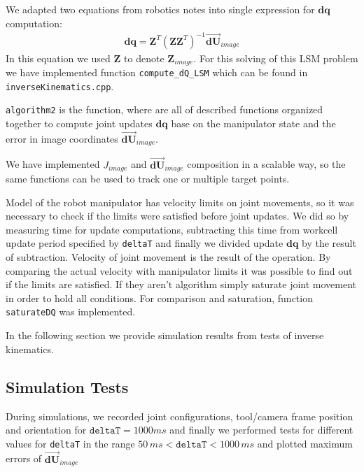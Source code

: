 \documentclass[]{scrartcl}
\begin{document}
We adapted two equations from robotics notes into single expression for ${\boldsymbol{dq}}$ computation:
\begin{align}
	\boldsymbol{dq} = \boldsymbol{Z}^T\left(\boldsymbol{Z}\boldsymbol{Z}^T\right)^{-1} \overrightarrow{\boldsymbol{dU}}_{image}
\end{align}
In this equation we used $\boldsymbol{Z}$ to denote $\boldsymbol{Z}_{image}$.
For this solving of this LSM problem we have implemented function \texttt{compute\_dQ\_LSM} which can be found in \texttt{inverseKinematics.cpp}.

\texttt{algorithm2} is the function, where are all of described functions organized together to compute joint updates $\boldsymbol{dq}$ base on the manipulator state and the error in image coordinates $\overrightarrow{\boldsymbol{dU}}_{image}$.

We have implemented $J_{image}$ and $\overrightarrow{\boldsymbol{dU}}_{image}$ composition in a scalable way, so the same functions can be used to track one or multiple target points.

Model of the robot manipulator has velocity limits on joint movements, so it was necessary to check if the limits were satisfied before joint updates. We did so by measuring time for update computations, subtracting this time from workcell update period specified by \texttt{deltaT} and finally we divided update $\boldsymbol{dq}$ by the result of subtraction. Velocity of joint movement is the result of the operation. By comparing the actual velocity with manipulator limits it was possible to find out if the limits are satisfied. If they aren't algorithm simply saturate joint movement in order to hold all conditions. For comparison and saturation, function \texttt{saturateDQ} was implemented.

In the following section we provide simulation results from tests of inverse kinematics.

\subsection{Simulation Tests}
During simulations, we recorded joint configurations, tool/camera frame position and orientation for $\texttt{deltaT} = 1000 ms$ and finally we performed tests for different values for \texttt{deltaT} in the range $50\, ms < \texttt{deltaT} < 1000\, ms$ and plotted maximum errors of 
$\overrightarrow{\boldsymbol{dU}}_{image}$
\end{document}
